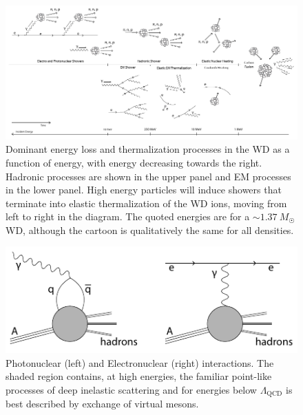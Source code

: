 \documentclass[twocolumn, preprintnumbers,amsmath,amssymb,prd, superscriptaddress]{revtex4}
\newcommand{\x}[1]{\ensuremath{\text{#1}}} %
\begin{document}
\begin{figure}
\includegraphics[scale=1.15]{cooling-cartoon.pdf}
\caption{Dominant energy loss and thermalization processes in the WD as a function of energy, with energy decreasing towards the right.  
Hadronic processes are shown in the upper panel and EM processes in the lower panel. 
High energy particles will induce showers that terminate into elastic thermalization of the WD ions, moving from left to right in the diagram. 
The quoted energies are for a $\sim 1.37 ~M_{\astrosun}$ WD, although the cartoon is qualitatively the same for all densities.}
\label{fig:cooling-cartoon}
\end{figure}



\begin{figure}
\includegraphics[scale=1.0]{electrophotonuclear-diagram.pdf}
\caption{Photonuclear (left) and Electronuclear (right) interactions. The shaded region contains, at high energies, the familiar point-like processes of deep inelastic scattering and for energies below $\Lambda_\x{QCD}$ is best described by exchange of virtual mesons.}
\label{fig:electrophotonuclear-diagram}
\end{figure}
\end{document}
